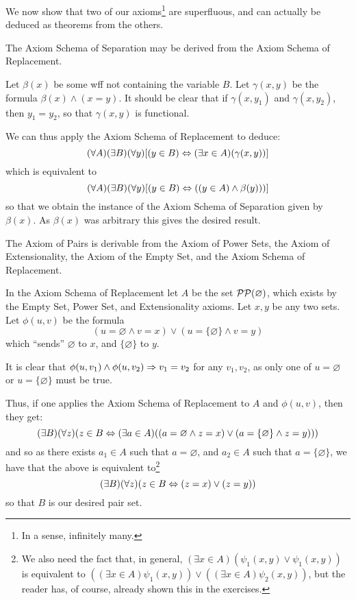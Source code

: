 We now show that two of our axioms\footnote{In a sense, infinitely many.} are superfluous, and can actually be deduced as theorems from the others. 

\begin{thm}
\label{Thm:_Replacement_->_Separation}
The Axiom Schema of Separation may be derived from the Axiom Schema of Replacement. 
\end{thm}

\begin{prf}
Let $\beta (x)$ be some wff not containing the variable $B$. Let $\gamma (x,y)$ be the formula $\beta (x)\land(x=y)$. It should be clear that if $\gamma (x,y_1)$ and $\gamma(x, y_2)$, then $y_1=y_2$, so that $\gamma(x, y)$ is functional. 

We can thus apply the Axiom Schema of Replacement to deduce: 
$$(\forall A)(\exists B)(\forall y)[(y\in B)\Leftrightarrow (\exists x\in A)(\gamma(x, y))]$$ 
which is equivalent to 
$$(\forall A)(\exists B)(\forall y)[(y\in B)\Leftrightarrow ((y\in A)\land \beta(y)))]$$ so that we obtain the instance of the Axiom Schema of Separation given by $\beta(x)$. As $\beta(x)$ was arbitrary this gives the desired result. 
\end{prf}

\begin{thm}
\label{Thm:_Powersets_and_Replacement_and_Emptyset_->_Pairs} The Axiom of Pairs is derivable from the Axiom of Power Sets, the Axiom of Extensionality, the Axiom of the Empty Set, and the Axiom Schema of Replacement. 
\end{thm}

\begin{prf}
In the Axiom Schema of Replacement let $A$ be the set $\mathcal{P}\mathcal{P}(\varnothing)$, which exists by the Empty Set, Power Set, and Extensionality axioms. Let $x, y$ be any two sets. Let $\phi(u, v)$ be the formula $$(u = \varnothing \land v=x)\lor(u=\{\varnothing\}\land v=y)$$ which \enquote{sends} $\varnothing$ to $x$, and $\{\varnothing\}$ to $y$.

It is clear that $\phi(u, v_1)\land\phi(u, v_2)\Rightarrow v_1 = v_2$ for any $v_1, v_2$, as only one of $u=\varnothing$ or $u=\{\varnothing\}$ must be true. 

Thus, if one applies the Axiom Schema of Replacement to $A$ and $\phi(u, v)$, then they get: 
$$(\exists B)(\forall z)(z\in B\Leftrightarrow (\exists a\in A)((a=\varnothing\land z=x)\lor(a=\{\varnothing\}\land z=y)))$$
and so as there exists $a_1\in A$ such that $a=\varnothing$, and $a_2\in A$ such that $a=\{\varnothing\}$, we have that the above is equivalent to\footnote{We also need the fact that, in general, $(\exists x\in A)(\psi_1(x, y)\lor\psi_1(x, y))$ is equivalent to  $((\exists x\in A)\psi_1(x, y))\lor((\exists x\in A)\psi_2(x, y))$, but the reader has, of course, already shown this in the exercises.}
$$(\exists B)(\forall z)(z\in B\Leftrightarrow (z=x)\lor(z=y))$$ so that $B$ is our desired pair set.
\end{prf}

